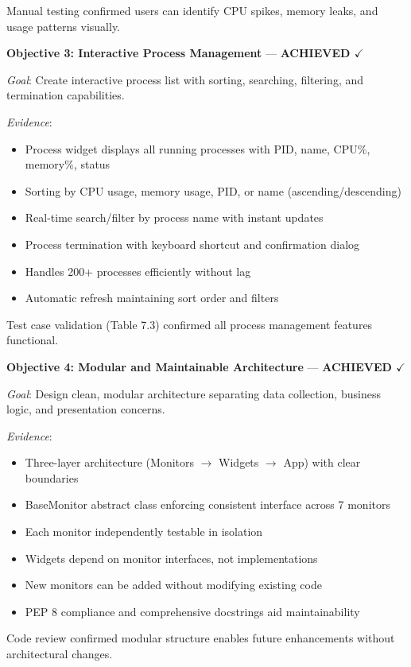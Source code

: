 \documentclass[12pt,a4paper,oneside]{report}
\begin{document}
Manual testing confirmed users can identify CPU spikes, memory leaks, and usage patterns visually.

\textbf{Objective 3: Interactive Process Management} --- \textbf{ACHIEVED $\checkmark$}

\textit{Goal}: Create interactive process list with sorting, searching, filtering, and termination capabilities.

\textit{Evidence}:
\begin{itemize}
    \item Process widget displays all running processes with PID, name, CPU\%, memory\%, status
    \item Sorting by CPU usage, memory usage, PID, or name (ascending/descending)
    \item Real-time search/filter by process name with instant updates
    \item Process termination with keyboard shortcut and confirmation dialog
    \item Handles 200+ processes efficiently without lag
    \item Automatic refresh maintaining sort order and filters
\end{itemize}

Test case validation (Table 7.3) confirmed all process management features functional.

\textbf{Objective 4: Modular and Maintainable Architecture} --- \textbf{ACHIEVED $\checkmark$}

\textit{Goal}: Design clean, modular architecture separating data collection, business logic, and presentation concerns.

\textit{Evidence}:
\begin{itemize}
    \item Three-layer architecture (Monitors $\rightarrow$ Widgets $\rightarrow$ App) with clear boundaries
    \item BaseMonitor abstract class enforcing consistent interface across 7 monitors
    \item Each monitor independently testable in isolation
    \item Widgets depend on monitor interfaces, not implementations
    \item New monitors can be added without modifying existing code
    \item PEP 8 compliance and comprehensive docstrings aid maintainability
\end{itemize}

Code review confirmed modular structure enables future enhancements without architectural changes.
\end{document}
